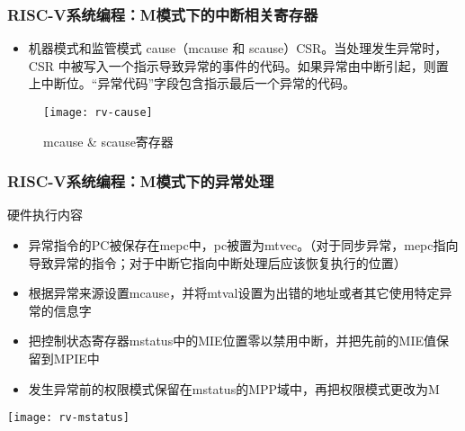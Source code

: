 
\begin{frame}
    \frametitle{RISC-V系统编程：M模式下的中断相关寄存器}
    \begin{itemize}
        \item 机器模式和监管模式 cause（mcause 和 scause）CSR。当处理发生异常时，CSR 中被写入一个指示导致异常的事件的代码。如果异常由中断引起，则置上中断位。“异常代码”字段包含指示最后一个异常的代码。
    \end{itemize}   
    \begin{figure}
        \centering
        \texttt{[image: rv-cause]}
        \caption{mcause  \& scause寄存器}
    \end{figure}
\end{frame}

\begin{frame}
    \frametitle{RISC-V系统编程：M模式下的异常处理}
    硬件执行内容
    \begin{itemize}
        \item 异常指令的PC被保存在mepc中，pc被置为mtvec。（对于同步异常，mepc指向导致异常的指令；对于中断它指向中断处理后应该恢复执行的位置）
        \item 根据异常来源设置mcause，并将mtval设置为出错的地址或者其它使用特定异常的信息字
        \item 把控制状态寄存器mstatus中的MIE位置零以禁用中断，并把先前的MIE值保留到MPIE中
        \item 发生异常前的权限模式保留在mstatus的MPP域中，再把权限模式更改为M
        
    \end{itemize}
    
        \centering
        \texttt{[image: rv-mstatus]}
    
\end{frame}



